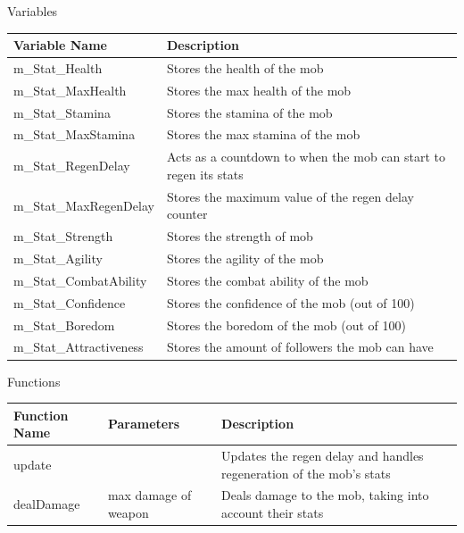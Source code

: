 \documentclass[../../Main.tex]{subfiles}
\begin{document}
    \begin{center}
        Variables
        \begin{tabular}{ | m{} | m{} | }
            \hline
            \textbf{Variable Name} & \textbf{Description} \\
            \hline
            m\_Stat\_Health & Stores the health of the mob \\
            \hline
            m\_Stat\_MaxHealth & Stores the max health of the mob \\
            \hline
            m\_Stat\_Stamina & Stores the stamina of the mob \\
            \hline
            m\_Stat\_MaxStamina & Stores the max stamina of the mob \\
            \hline
            m\_Stat\_RegenDelay & Acts as a countdown to when the mob can start to regen its stats\\
            \hline
            m\_Stat\_MaxRegenDelay & Stores the maximum value of the regen delay counter\\
            \hline
            m\_Stat\_Strength & Stores the strength of mob \\
            \hline
            m\_Stat\_Agility & Stores the agility of the mob \\
            \hline
            m\_Stat\_CombatAbility & Stores the combat ability of the mob \\
            \hline
            m\_Stat\_Confidence & Stores the confidence of the mob (out of 100) \\
            \hline
            m\_Stat\_Boredom & Stores the boredom of the mob (out of 100) \\
            \hline
            m\_Stat\_Attractiveness & Stores the amount of followers the mob can have \\
            \hline
        \end{tabular}
        Functions
        \begin{tabular}{ | m{} | m{}| m{} | }
            \hline
            \textbf{Function Name} & \textbf{Parameters} & \textbf{Description} \\
            \hline
            update & & Updates the regen delay and handles regeneration of the mob's stats \\
            \hline
            dealDamage & max damage of weapon & Deals damage to the mob, taking into account their stats \\

\end{tabular}
\end{center}
\end{document}

